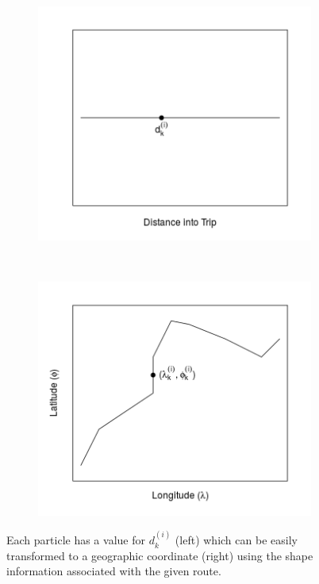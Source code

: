 \documentclass[12pt,a4paper]{article}
\begin{document}
\begin{figure}[!b]
  \centering
  \begin{subfigure}{0.4\textwidth}
    \includegraphics[width=\textwidth]{gps-dist2.png}
    \label{fig:gpsdist-1}
  \end{subfigure}
  ~
  \begin{subfigure}{0.4\textwidth}
    \includegraphics[width=\textwidth]{gps-dist1.png}
    \label{fig:gpsdist-2}
  \end{subfigure}
  \caption{%
  Each particle has a value for $d_k^{(i)}$ (left) which can be easily transformed
  to a geographic coordinate (right) using the shape information associated with
  the given route.}
  \label{fig:gpsdist}
\end{figure}
\end{document}
